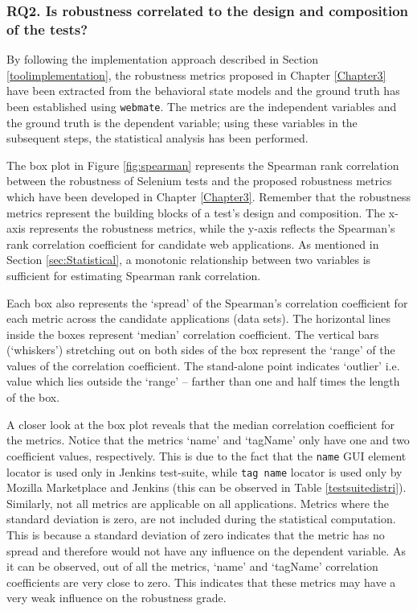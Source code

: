 \subsubsection*{{\bfseries RQ2.} Is robustness correlated to the design and composition of the tests?}

By following the implementation approach described in Section \ref{toolimplementation}, the robustness metrics proposed in Chapter \ref{Chapter3} have been extracted from the behavioral state models and the ground truth has been established using \texttt{webmate}. The metrics are the independent variables and the ground truth is the dependent variable; using these variables in the subsequent steps, the statistical analysis has been performed.

The box plot in Figure \ref{fig:spearman} represents the Spearman rank correlation between the robustness of Selenium tests and the proposed robustness metrics which have been developed in Chapter \ref{Chapter3}. Remember that the robustness metrics represent the building blocks of a test's design and composition. The x-axis represents the robustness metrics, while the y-axis reflects the Spearman's rank correlation coefficient for candidate web applications. As mentioned in Section \ref{sec:Statistical}, a monotonic relationship between two variables is sufficient for estimating Spearman rank correlation. 

Each box also represents the `spread' of the Spearman's correlation coefficient for each metric across the candidate applications (data sets). The horizontal lines inside the boxes represent `median' correlation coefficient. The vertical bars (`whiskers') stretching out on both sides of the box represent the `range' of the values of the correlation coefficient. The stand-alone point indicates `outlier' i.e. value which lies outside the `range' -- farther than one and half times the length of the box. 

A closer look at the box plot reveals that the median correlation coefficient for the metrics. Notice that the metrics `name' and `tagName' only have one and two coefficient values, respectively. This is due to the fact that the \texttt{name} GUI element locator is used only in Jenkins test-suite, while \texttt{tag name} locator is used only by Mozilla Marketplace and Jenkins (this can be observed in Table \ref{testsuitedistri}). Similarly, not all metrics are applicable on all applications. Metrics where the standard deviation is zero, are not included during the statistical computation. This is because a standard deviation of zero indicates that the metric has no spread and therefore would not have any influence on the dependent variable. As it can be observed, out of all the metrics, `name' and `tagName' correlation coefficients are very close to zero. This indicates that these metrics may have a very weak influence on the robustness grade. 

